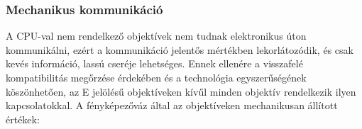 
\subsubsection{Mechanikus kommunikáció}
A CPU-val nem rendelkező objektívek nem tudnak elektronikus úton kommunikálni, ezért a kommunikáció jelentős mértékben lekorlátozódik, és csak kevés információ, lassú cseréje lehetséges. Ennek ellenére a visszafelé kompatibilitás megőrzése érdekében és a technológia egyszerűségének köszönhetően, az E jelölésű objektíveken kívűl minden objektív rendelkezik ilyen kapcsolatokkal.
A fényképezőváz által az objektíveken mechanikusan állított értékek:
